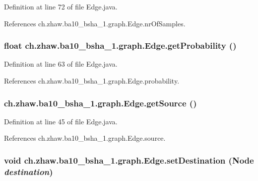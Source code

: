 Definition at line 72 of file Edge.java.

References ch.zhaw.ba10\_\-bsha\_\-1.graph.Edge.nrOfSamples.\hypertarget{classch_1_1zhaw_1_1ba10__bsha__1_1_1graph_1_1Edge_a7299d8da56c8e7774df3252c34ad631e}{
\subsubsection[{getProbability}]{\setlength{\rightskip}{0pt plus 5cm}float ch.zhaw.ba10\_\-bsha\_\-1.graph.Edge.getProbability ()}}
\label{classch_1_1zhaw_1_1ba10__bsha__1_1_1graph_1_1Edge_a7299d8da56c8e7774df3252c34ad631e}


Definition at line 63 of file Edge.java.

References ch.zhaw.ba10\_\-bsha\_\-1.graph.Edge.probability.\hypertarget{classch_1_1zhaw_1_1ba10__bsha__1_1_1graph_1_1Edge_a91ac8fa39b491040897bf69ce8427700}{
\subsubsection[{getSource}]{ ch.zhaw.ba10\_\-bsha\_\-1.graph.Edge.getSource ()}}
\label{classch_1_1zhaw_1_1ba10__bsha__1_1_1graph_1_1Edge_a91ac8fa39b491040897bf69ce8427700}


Definition at line 45 of file Edge.java.

References ch.zhaw.ba10\_\-bsha\_\-1.graph.Edge.source.\hypertarget{classch_1_1zhaw_1_1ba10__bsha__1_1_1graph_1_1Edge_a671037e83a841e6d651a688526d7722d}{
\subsubsection[{setDestination}]{\setlength{\rightskip}{0pt plus 5cm}void ch.zhaw.ba10\_\-bsha\_\-1.graph.Edge.setDestination ({\bf Node} {\em destination})}}
\label{classch_1_1zhaw_1_1ba10__bsha__1_1_1graph_1_1Edge_a671037e83a841e6d651a688526d7722d}


